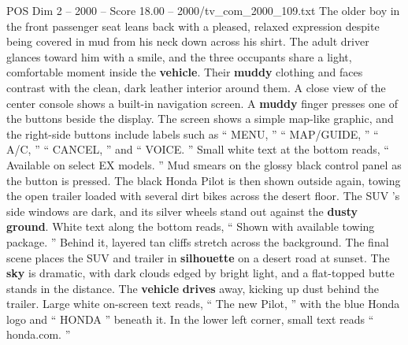 \begin{textsample}{POS Dim 2 – 2000 – Score 18.00 – 2000/tv\_com\_2000\_109.txt}
The older boy in the front passenger seat leans back with a pleased, relaxed expression despite being covered in mud from his neck down across his shirt.
The adult driver glances toward him with a smile, and the three occupants share a light, comfortable moment inside the \textbf{vehicle}.
Their \textbf{muddy} clothing and faces contrast with the clean, dark leather interior around them.
A close view of the center console shows a built-in navigation screen.
A \textbf{muddy} finger presses one of the buttons beside the display.
The screen shows a simple map-like graphic, and the right-side buttons include labels such as “ MENU, ” “ MAP/GUIDE, ” “ A/C, ” “ CANCEL, ” and “ VOICE. ” Small white text at the bottom reads, “ Available on select EX models. ” Mud smears on the glossy black control panel as the button is pressed.
The black Honda Pilot is then shown outside again, towing the open trailer loaded with several dirt bikes across the desert floor.
The SUV ’s side windows are dark, and its silver wheels stand out against the \textbf{dusty} \textbf{ground}.
White text along the bottom reads, “ Shown with available towing package. ” Behind it, layered tan cliffs stretch across the background.
The final scene places the SUV and trailer in \textbf{silhouette} on a desert road at sunset.
The \textbf{sky} is dramatic, with dark clouds edged by bright light, and a flat-topped butte stands in the distance.
The \textbf{vehicle} \textbf{drives} away, kicking up dust behind the trailer.
Large white on-screen text reads, “ The new Pilot, ” with the blue Honda logo and “ HONDA ” beneath it.
In the lower left corner, small text reads “ honda.com. ”

\end{textsample}
